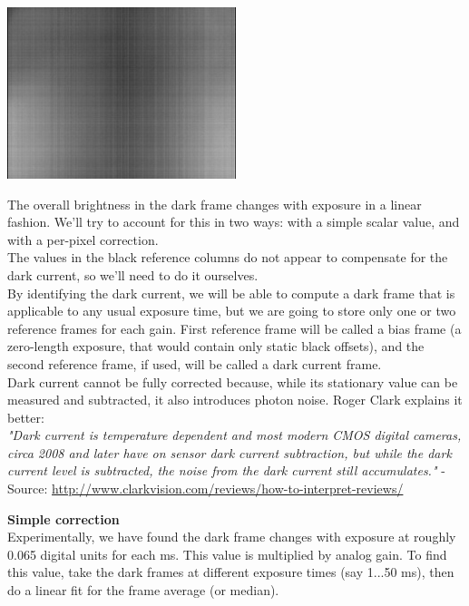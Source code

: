 \begin{center}
\includegraphics[height=5cm]{images/blackframes-gainx1-offset2047-64ms-01}
\end{center}

The overall brightness in the dark frame changes with exposure in a linear fashion. We'll try to account for this in two ways: with a simple scalar value, and with a per-pixel correction.\\

The values in the black reference columns do not appear to compensate for the dark current, so we'll need to do it ourselves.\\

By identifying the dark current, we will be able to compute a dark frame that is applicable to any usual exposure time, but we are going to store only one or two reference frames for each gain. First reference frame will be called a bias frame (a zero-length exposure, that would contain only static black offsets), and the second reference frame, if used, will be called a dark current frame.\\

Dark current cannot be fully corrected because, while its stationary value can be measured and subtracted, it also introduces photon noise. Roger Clark explains it better:\\ 

\textit{"Dark current is temperature dependent and most modern CMOS digital cameras, circa 2008 and later have on sensor dark current subtraction, but while the dark current level is subtracted, the noise from the dark current still accumulates."} - Source: \href{http://www.clarkvision.com/reviews/how-to-interpret-reviews/}{http://www.clarkvision.com/reviews/how-to-interpret-reviews/}

\textbf{Simple correction}\\

Experimentally, we have found the dark frame changes with exposure at roughly 0.065 digital units for each ms. This value is multiplied by analog gain. To find this value, take the dark frames at different exposure times (say 1...50 ms), then do a linear fit for the frame average (or median).\\

